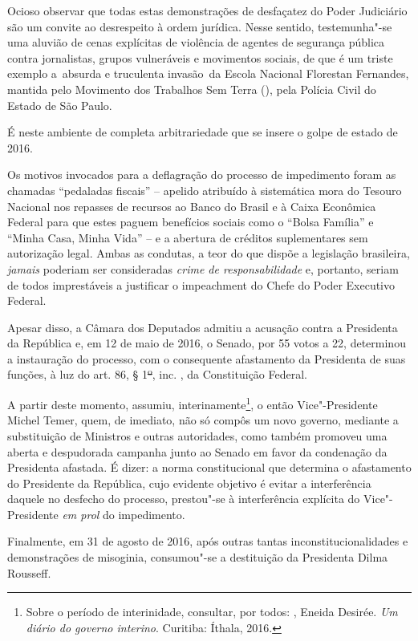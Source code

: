 Ocioso observar que todas estas demonstrações de desfaçatez do Poder
Judiciário são um convite ao desrespeito à ordem jurídica. Nesse
sentido, testemunha"-se uma aluvião de cenas explícitas de violência de
agentes de segurança pública contra jornalistas, grupos vulneráveis e
movimentos sociais, de que é um triste exemplo a~absurda e truculenta
invasão~da Escola Nacional Florestan Fernandes, mantida pelo Movimento
dos Trabalhos Sem Terra (), pela Polícia Civil do Estado de São
Paulo.

É neste ambiente de completa arbitrariedade que se insere o golpe de
estado de 2016.

Os motivos invocados para a deflagração do processo de impedimento foram
as chamadas ``pedaladas fiscais'' -- apelido atribuído à sistemática
mora do Tesouro Nacional nos repasses de recursos ao Banco do Brasil e à
Caixa Econômica Federal para que estes paguem benefícios sociais como o
``Bolsa Família'' e ``Minha Casa, Minha Vida'' -- e a abertura de
créditos suplementares sem autorização legal. Ambas as condutas, a teor
do que dispõe a legislação brasileira, \emph{jamais} poderiam ser
consideradas \emph{crime de responsabilidade} e, portanto, seriam de
todos imprestáveis a justificar o impeachment do Chefe do Poder
Executivo Federal.

Apesar disso, a Câmara dos Deputados admitiu a acusação contra a
Presidenta da República e, em 12 de maio de 2016, o Senado, por 55 votos
a 22, determinou a instauração do processo, com o consequente
afastamento da Presidenta de suas funções, à luz do art. 86, §
1\sout{º}, inc. , da Constituição Federal.

A partir deste momento, assumiu, interinamente\footnote{Sobre o período
  de interinidade, consultar, por todos: , Eneida Desirée.
  \emph{Um diário do governo interino}. Curitiba: Íthala, 2016.}, o
então Vice"-Presidente Michel Temer, quem, de imediato, não só compôs um
novo governo, mediante a substituição de Ministros e outras autoridades,
como também promoveu uma aberta e despudorada campanha junto ao Senado
em favor da condenação da Presidenta afastada. É dizer: a norma
constitucional que determina o afastamento do Presidente da República,
cujo evidente objetivo é evitar a interferência daquele no desfecho do
processo, prestou"-se à interferência explícita do Vice"-Presidente
\emph{em prol} do impedimento.

Finalmente, em 31 de agosto de 2016, após outras tantas
inconstitucionalidades e demonstrações de misoginia, consumou"-se a
destituição da Presidenta Dilma Rousseff.

